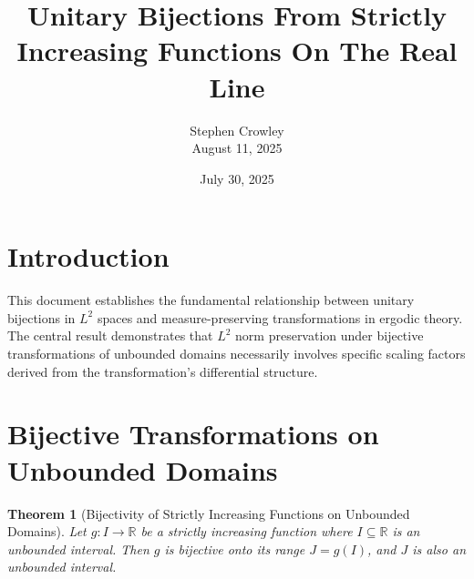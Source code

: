 \documentclass{article}
\newcommand{\tmaffiliation}[1]{\\ #1}
\newtheorem{theorem}{Theorem}
\begin{document}
\title{Unitary Bijections From Strictly Increasing Functions On The Real Line
}

\author{
  Stephen Crowley
  \tmaffiliation{August 11, 2025}
}

\date{July 30, 2025}

\maketitle

{\tableofcontents}

\section{Introduction}

This document establishes the fundamental relationship between unitary
bijections in $L^2$ spaces and measure-preserving transformations in ergodic
theory. The central result demonstrates that $L^2$ norm preservation under
bijective transformations of unbounded domains necessarily involves specific
scaling factors derived from the transformation's differential structure.

\section{Bijective Transformations on Unbounded Domains}

\begin{theorem}
  [Bijectivity of Strictly Increasing Functions on Unbounded
  Domains]\label{thm:bijective_unbounded}Let $g : I \to \mathbb{R}$ be a
  strictly increasing function where $I \subseteq \mathbb{R}$ is an unbounded
  interval. Then $g$ is bijective onto its range $J = g (I)$, and $J$ is also
  an unbounded interval.
\end{theorem}
\end{document}
